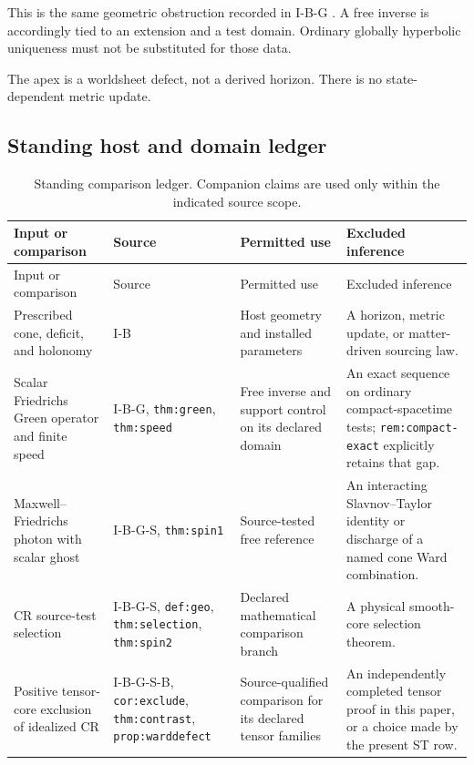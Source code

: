 \documentclass[11pt,a4paper]{article}
\newcommand{\loc}[1]{\nolinkurl{#1}}
\theoremstyle{plain}
\theoremstyle{definition}
\theoremstyle{remark}
\numberwithin{equation}{section}
\begin{document}
This is the same geometric obstruction recorded in I-B-G
\cite[\loc{prop:nonGH}]{CheungIBG}. A free inverse is accordingly
tied to an extension and a test domain. Ordinary globally
hyperbolic uniqueness must not be substituted for those data.

The apex is a worldsheet defect, not a derived horizon. There is
no state-dependent metric update.

\subsection{Standing host and domain ledger}

\begingroup
\small
\renewcommand{\arraystretch}{1.12}
\begin{longtable}{@{}L{.20\linewidth}L{.22\linewidth}
                      L{.26\linewidth}L{.25\linewidth}@{}}
\caption{Standing comparison ledger. Companion claims are used
only within the indicated source scope.}
\label{tab:domain}\\
\toprule
Input or comparison & Source & Permitted use & Excluded inference\\
\midrule
\endfirsthead
\toprule
Input or comparison & Source & Permitted use & Excluded inference\\
\midrule
\endhead
\bottomrule
\endfoot

Prescribed cone, deficit, and holonomy &
I-B \cite{CheungIB} &
Host geometry and installed parameters &
A horizon, metric update, or matter-driven sourcing law.\\

Scalar Friedrichs Green operator and finite speed &
I-B-G, \loc{thm:green}, \loc{thm:speed}
\cite{CheungIBG} &
Free inverse and support control on its declared domain &
An exact sequence on ordinary compact-spacetime tests;
\loc{rem:compact-exact} explicitly retains that gap.\\

Maxwell--Friedrichs photon with scalar ghost &
I-B-G-S, \loc{thm:spin1}
\cite{CheungIBGS} &
Source-tested free reference &
An interacting Slavnov--Taylor identity or discharge of a
named cone Ward combination.\\

CR source-test selection &
I-B-G-S, \loc{def:geo}, \loc{thm:selection},
\loc{thm:spin2} \cite{CheungIBGS} &
Declared mathematical comparison branch &
A physical smooth-core selection theorem.\\

Positive tensor-core exclusion of idealized CR &
I-B-G-S-B, \loc{cor:exclude}, \loc{thm:contrast},
\loc{prop:warddefect} \cite{CheungTensor} &
Source-qualified comparison for its declared tensor families &
An independently completed tensor proof in this paper, or a
choice made by the present ST row.\\


\end{longtable}
\end{document}
